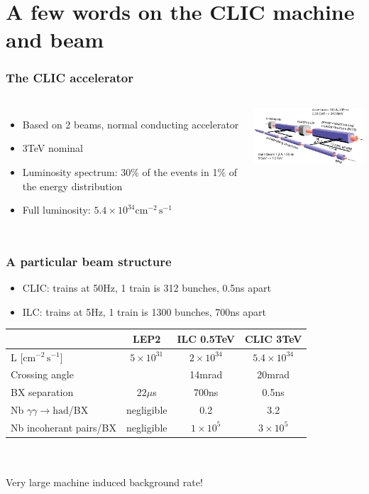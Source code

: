 \documentclass{beamer}
\begin{document}
\section[CLIC]{A few words on the CLIC machine and beam} 
\begin{frame}
\frametitle{The CLIC accelerator}
\begin{columns}[c]
\column{6cm}
\begin{itemize}
  \item Based on 2 beams, normal conducting accelerator
  \item 3TeV nominal 
  \item Luminosity spectrum: 30\% of the events in 1\% of the energy
  distribution
  \item Full luminosity: $5.4\times
  10^{34}\textrm{cm}^{-2}\,\textrm{s}^{-1}$
\end{itemize}
\column{6cm}
\includegraphics[width=6cm]{accel}
\end{columns}
\end{frame}

\begin{frame}
\frametitle{A particular beam structure}
\begin{itemize}
  \item CLIC: trains at 50Hz, 1 train is 312 bunches, 0.5ns apart
  \item ILC: trains at 5Hz, 1 train is 1300 bunches, 700ns apart
\end{itemize}
\centering
\begin{tabular}{lccc}
 & LEP2 & ILC 0.5TeV & CLIC 3TeV\\
 \hline
L [$\textrm{cm}^{-2}\,\textrm{s}^{-1}$] & $5\times 10^{31}$ & $2\times 10^{34}$& $5.4\times 10^{34}$ \\ 
\hline
Crossing angle & ~ & 14mrad & 20mrad\\
\hline
BX separation & 22$\mu$s & 700ns & \alert{0.5ns}\\
\hline
Nb $\gamma\gamma\to\textrm{had}$/BX & negligible & 0.2 & \alert{3.2}\\
\hline
Nb incoherant pairs/BX & negligible & $1\times 10^5$ & \alert{$3\times10^5$}\\
\hline
\end{tabular}
~\\
~\\
\alert{Very large machine induced background rate!}
\end{frame}
\end{document}
